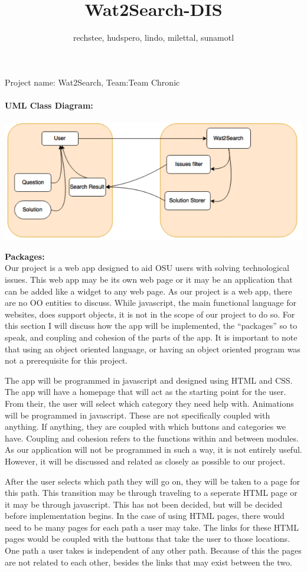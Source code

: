 \documentclass[12pt, letterpaper]{article}
\title{Wat2Search-DIS}
\author{rechstee, hudspero, lindo, milettal, sunamotl 
}
\begin{document}
\maketitle Project name: Wat2Search, Team:Team Chronic
	\\\\\textbf{UML Class Diagram:}
	\\\\\hbox{\includegraphics[scale=.75]{UML_oo.png}}

	\textbf{Packages:}
		\\\indent Our project is a web app designed to aid OSU users with solving technological issues. This web app may be its own web page or it may be an application that can be added like a widget to any web page. As our project is a web app, there are no OO entities to discuss. While javascript, the main functional language for websites, does support objects, it is not in the scope of our project to do so. For this section I will discuss how the app will be implemented, the “packages” so to speak, and coupling and cohesion of the parts of the app. It is important to note that using an object oriented language, or having an object oriented program was not a prerequisite for this project.
		
		The app will be programmed in javascript and designed using HTML and CSS. The app will have a homepage that will act as the starting point for the user. From their, the user will select which category they need help with. Animations will be programmed in javascript. These are not specifically coupled with anything. If anything, they are coupled with which buttons and categories we have. Coupling and cohesion refers to the functions within and between modules. As our application will not be programmed in such a way, it is not entirely useful. However, it will be discussed and related as closely as possible to our project. 
		
		After the user selects which path they will go on, they will be taken to a page for this path. This transition may be through traveling to a seperate HTML page or it may be through javascript. This has not been decided, but will be decided before implementation begins. In the case of using HTML pages, there would need to be many pages for each path a user may take. The links for these HTML pages would be coupled with the buttons that take the user to those locations. One path a user takes is independent of any other path. Because of this the pages are not related to each other, besides the links that may exist between the two.
		
\end{document}
